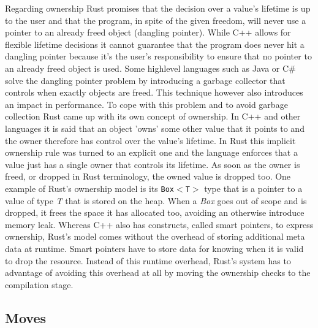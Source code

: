 Regarding ownership Rust promises that the decision over a value's lifetime is up to the user and that the program, in spite of the given freedom, will never use a pointer to an already freed object (dangling pointer). While C++ allows for flexible lifetime decisions it cannot guarantee that the program does never hit a dangling pointer because it's the user's responsibility to ensure that no pointer to an already freed object is used.
Some highlevel languages such as Java or C\# solve the dangling pointer problem by introducing a garbage collector that controls when exactly objects are freed. This technique however also introduces an impact in performance.
To cope with this problem and to avoid garbage collection Rust came up with its own concept of ownership. In C++ and other languages it is said that an object 'owns' some other value that it points to and the owner therefore has control over the value's lifetime. In Rust this implicit ownership rule was turned to an explicit one and the language enforces that a value just has a single owner that controls its lifetime. As soon as the owner is freed, or dropped in Rust terminology, the owned value is dropped too. One example of Rust's ownership model is its \texttt{Box$<$T$>$} type that is a pointer to a value of type \textit{T} that is stored on the heap. When a \textit{Box} goes out of scope and is dropped, it frees the space it has allocated too, avoiding an otherwise introduce memory leak. \cite[Chapter 4. Ownership]{ProgrammingRust}
Whereas C++ also has constructs, called smart pointers, to express ownership, Rust's model comes without the overhead of storing additional meta data at runtime. Smart pointers have to store data for knowing when it is valid to drop the resource. Instead of this runtime overhead, Rust's system has to advantage of avoiding this overhead at all by moving the ownership checks to the compilation stage.

\subsection{Moves}


